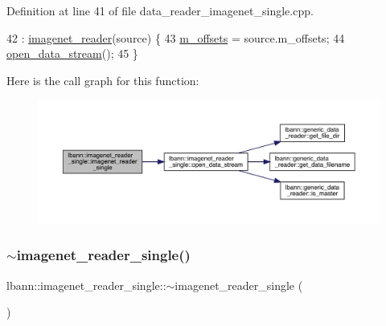Definition at line 41 of file data\+\_\+reader\+\_\+imagenet\+\_\+single.\+cpp.


\begin{DoxyCode}
42   : \hyperlink{classlbann_1_1imagenet__reader_a642331b94cdc3caad8335d65d096141c}{imagenet\_reader}(source) \{
43   \hyperlink{classlbann_1_1imagenet__reader__single_a605ba53f4e3fa02a4fced38d41465a10}{m\_offsets} = source.m\_offsets;
44   \hyperlink{classlbann_1_1imagenet__reader__single_a8db14d15bfc2de92ffb3c20f1a38dd00}{open\_data\_stream}();
45 \}
\end{DoxyCode}
Here is the call graph for this function\+:\nopagebreak
\begin{figure}[H]
\begin{center}
\leavevmode
\includegraphics[width=350pt]{classlbann_1_1imagenet__reader__single_abf3174dec9942137107faf6ef4d24e37_cgraph}
\end{center}
\end{figure}
\mbox{\label{classlbann_1_1imagenet__reader__single_a6849f7af5ad0197f077f60c86a3c6c26}} 
\subsubsection{\texorpdfstring{$\sim$imagenet\+\_\+reader\+\_\+single()}{~imagenet\_reader\_single()}}
{\footnotesize\ttfamily lbann\+::imagenet\+\_\+reader\+\_\+single\+::$\sim$imagenet\+\_\+reader\+\_\+single (\begin{DoxyParamCaption}{ }\end{DoxyParamCaption})\hspace{0.3cm}{\ttfamily [override]}}



